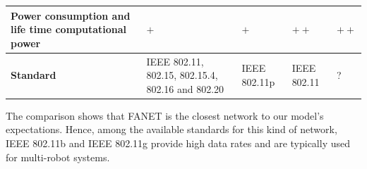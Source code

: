 \documentclass[11pt,openany]{book}
\begin{document}
\begin{table}[H]
\begin{tabular}{|p{2.8cm}|p{1.5cm}|p{1.5cm}|p{1.8cm}|p{1.8cm}|}
        \textbf{Power consumption and life time computational power} & $+$                                               & $+$                            & $++$                                                                 & $++$                           \\\hline
        \textbf{Standard}                                            & IEEE 802.11, 802.15, 802.15.4, 802.16 and 802.20  & IEEE 802.11p                   & IEEE 802.11                                                          & ?                              \\\hline
    \end{tabular}
\end{table}
The comparison shows that FANET is the closest network to our model’s expectations. Hence, among the available standards for this kind of network, IEEE 802.11b and IEEE 802.11g provide high data rates and are typically used for multi-robot systems.
\end{document}
